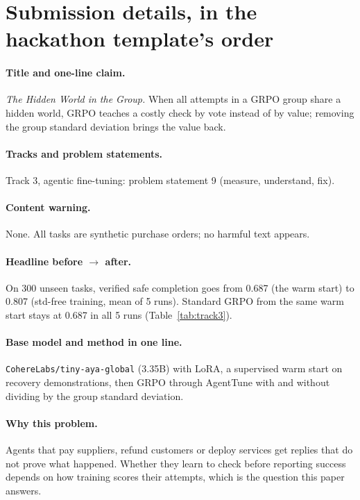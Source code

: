 \section{Submission details, in the hackathon template's order}\label{app4:submission}
{\small
\paragraph{Title and one-line claim.} \emph{The Hidden World in the Group.} When all attempts in a GRPO group share a
hidden world, GRPO teaches a costly check by vote instead of by value; removing the group standard deviation brings
the value back.

\paragraph{Tracks and problem statements.} Track 3, agentic fine-tuning: problem statement 9 (measure, understand,
fix).

\paragraph{Content warning.} None. All tasks are synthetic purchase orders; no harmful text appears.

\paragraph{Headline before $\rightarrow$ after.} On 300 unseen tasks, verified safe completion goes from 0.687 (the
warm start) to 0.807 (std-free training, mean of 5 runs). Standard GRPO from the same warm start stays at 0.687 in all
5 runs (Table~\ref{tab:track3}).

\paragraph{Base model and method in one line.} \texttt{CohereLabs/tiny-aya-global} (3.35B) with LoRA, a supervised warm
start on recovery demonstrations, then GRPO through AgentTune with and without dividing by the group standard
deviation.

\paragraph{Why this problem.} Agents that pay suppliers, refund customers or deploy services get replies that do not
prove what happened. Whether they learn to check before reporting success depends on how training scores their
attempts, which is the question this paper answers.

}
